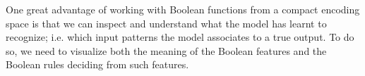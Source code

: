 One great advantage of working with Boolean functions from a compact encoding
space is that we can inspect and understand what the model has learnt to
recognize; i.e. which input patterns the model associates to a true output. To
do so, we need to visualize both the meaning of the Boolean features and the
Boolean rules deciding from such features.

\begin{figure}[tb]
	\centering
\end{figure}
